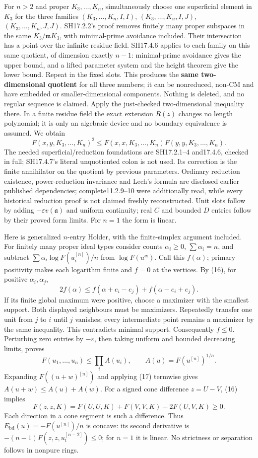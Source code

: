 \documentclass[
  11pt,
]{article}
\begin{document}
For \(n>2\) and proper \(K_3,\ldots,K_n\), simultaneously choose one
superficial element in \(K_3\) for the three families
\((K_3,\ldots,K_n,I,I)\), \((K_3,\ldots,K_n,I,J)\),
\((K_3,\ldots,K_n,J,J)\). SH17.2.2's proof removes finitely many proper
subspaces in the same \(K_3/\mathfrak mK_3\), with minimal-prime
avoidance included. Their intersection has a point over the infinite
residue field. SH17.4.6 applies to each family on this same quotient, of
dimension exactly \(n-1\): minimal-prime avoidance gives the upper
bound, and a lifted parameter system and the height theorem give the
lower bound. Repeat in the fixed slots. This produces the \textbf{same
two-dimensional quotient} for all three numbers; it can be nonreduced,
non-CM and have embedded or smaller-dimensional components. Nothing is
deleted, and no regular sequence is claimed. Apply the just-checked
two-dimensional inequality there. In a finite residue field the exact
extension \(R(z)\) changes no length polynomial; it is only an algebraic
device and no boundary equivalence is assumed. We obtain
\[F(x,y,K_3,\ldots,K_n)^2\le F(x,x,K_3,\ldots,K_n)F(y,y,K_3,\ldots,K_n).\tag{16}\]
The needed superficial/reduction foundations are SH17.2.1--4 and17.4.6,
checked in full; SH17.4.7's literal unquotiented colon is not used. Its
correction is the finite annihilator on the quotient by previous
parameters. Ordinary reduction existence, power-reduction invariance and
Lech's formula are disclosed earlier published dependencies;
complete11.2.9--10 were additionally read, while every historical
reduction proof is not claimed freshly reconstructed. Unit slots follow
by adding \(-\varepsilon v(\mathfrak a)\) and uniform continuity; real
\(C\) and bounded \(D\) entries follow by their proved form limits. For
\(n=1\) the form is linear.

Here is generalized \(n\)-entry Holder, with the finite-simplex argument
included. For finitely many proper ideal types consider counts
\(\alpha_i\ge0\), \(\sum\alpha_i=n\), and subtract
\(\sum\alpha_i\log F(u_i^{[n]})/n\) from
\(\log F(u^{\boldsymbol\alpha})\). Call this \(f(\alpha)\); primary
positivity makes each logarithm finite and \(f=0\) at the vertices. By
(16), for positive \(\alpha_i,\alpha_j\),
\[2f(\alpha)\le f(\alpha+e_i-e_j)+f(\alpha-e_i+e_j).\] If its finite
global maximum were positive, choose a maximizer with the smallest
support. Both displayed neighbours must be maximizers. Repeatedly
transfer one unit from \(j\) to \(i\) until \(j\) vanishes; every
intermediate point remains a maximizer by the same inequality. This
contradicts minimal support. Consequently \(f\le0\). Perturbing zero
entries by \(-\varepsilon\), then taking uniform and bounded decreasing
limits, proves
\[F(u_1,\ldots,u_n)\le\prod_i A(u_i),\qquad A(u)=F(u^{[n]})^{1/n}.\tag{17}\]
Expanding \(F((u+w)^{[n]})\) and applying (17) termwise gives
\(A(u+w)\le A(u)+A(w)\). For a signed cone difference \(z=U-V\), (16)
implies \[F(z,z,K)=F(U,U,K)+F(V,V,K)-2F(U,V,K)\ge0.\] Each direction in
a cone segment is such a difference. Thus
\(E_{\mathrm{bd}}(u)=-F(u^{[n]})/n\) is concave: its second derivative
is \(-(n-1)F(z,z,u_t^{[n-2]})\le0\); for \(n=1\) it is linear. No
strictness or separation follows in nonpure rings.
\end{document}
